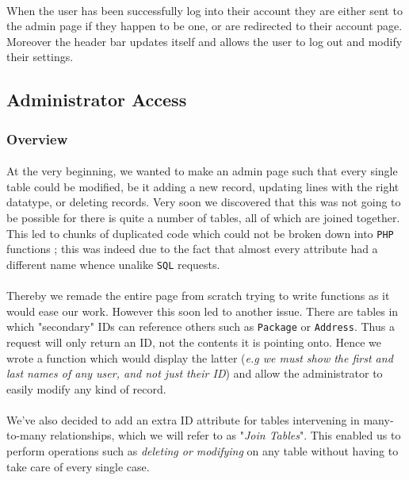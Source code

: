 \documentclass[11pt,a4paper,titlepage]{article}
\begin{document}
\paragraph{}
When the user has been successfully log into their account they are either sent to the admin page if they happen to be one, or are redirected to their account page. Moreover the header bar updates itself and allows the user to log out and modify their settings.

\subsection{Administrator Access}
\subsubsection{Overview}

\paragraph{}
At the very beginning, we wanted to make an admin page such that every single table could be modified, be it adding a new record, updating lines with the right datatype, or deleting records. Very soon we discovered that this was not going to be possible for there is quite a number of tables, all of which are joined together. This led to chunks of duplicated code which could not be broken down into \verb|PHP| functions ; this was indeed due to the fact that almost every attribute had a different name whence unalike \verb|SQL| requests. 
\paragraph{}
Thereby we remade the entire page from scratch trying to write functions as it would ease our work. However this soon led to another issue. There are tables in which "secondary" IDs can reference others such as \verb|Package| or \verb|Address|. Thus a request will only return an ID, not the contents it is pointing onto. Hence we wrote a function which would display the latter (\textit{e.g we must show the first and last names of any user, and not just their ID}) and allow the administrator to easily modify any kind of record.
\paragraph{}
We've also decided to add an extra ID attribute for tables intervening in many-to-many relationships, which we will refer to as "\textit{Join Tables}". This enabled us to perform operations such as \textit{deleting or modifying} on any table without having to take care of every single case.
\end{document}
